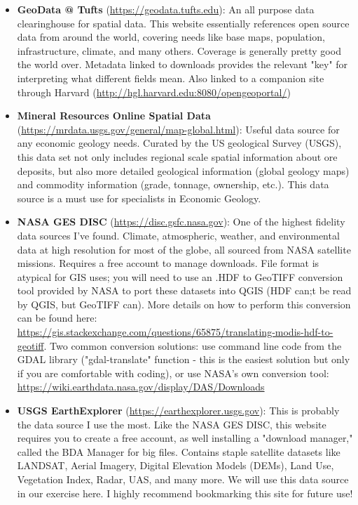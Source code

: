 \documentclass{article}
\begin{document}
\begin{itemize}
    \item \textbf{GeoData @ Tufts} (\url{https://geodata.tufts.edu}): An all purpose data clearinghouse for spatial data. This website essentially references open source data from around the world, covering needs like base maps, population, infrastructure, climate, and many others. Coverage is generally pretty good the world over. Metadata linked to downloads provides the relevant "key" for interpreting what different fields mean. Also linked to a companion site through Harvard (\url{http://hgl.harvard.edu:8080/opengeoportal/})
    \item \textbf{Mineral Resources Online Spatial Data} (\url{https://mrdata.usgs.gov/general/map-global.html}): Useful data source for any economic geology needs. Curated by the US geological Survey (USGS), this data set not only includes regional scale spatial information about ore deposits, but also more detailed geological information (global geology maps) and commodity information (grade, tonnage, ownership, etc.). This data source is a must use for specialists in Economic Geology.
    \item \textbf{NASA GES DISC} (\url{https://disc.gsfc.nasa.gov}): One of the highest fidelity data sources I've found. Climate, atmospheric, weather, and environmental data at high resolution for most of the globe, all sourced from NASA satellite missions. Requires a free account to manage downloads. File format is atypical for GIS uses; you will need to use an .HDF to GeoTIFF conversion tool provided by NASA to port these datasets into QGIS (HDF can;t be read by QGIS, but GeoTIFF can). More details on how to perform this conversion can be found here: \url{https://gis.stackexchange.com/questions/65875/translating-modis-hdf-to-geotiff}. Two common conversion solutions: use command line code from the GDAL library ("gdal-translate" function - this is the easiest solution but only if you are comfortable with coding), or use NASA's own conversion tool: \url{https://wiki.earthdata.nasa.gov/display/DAS/Downloads}
    \item \textbf{USGS EarthExplorer} (\url{https://earthexplorer.usgs.gov}): This is probably the data source I use the most. Like the NASA GES DISC, this website requires you to create a free account, as well installing a "download manager," called the BDA Manager for big files. Contains staple satellite datasets like LANDSAT, Aerial Imagery, Digital Elevation Models (DEMs), Land Use, Vegetation Index, Radar, UAS, and many more. We will use this data source in our exercise here. I highly recommend bookmarking this site for future use!

\end{itemize}
\end{document}
